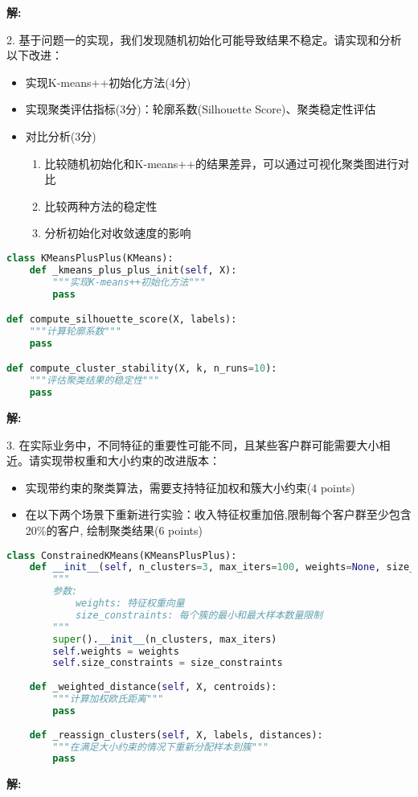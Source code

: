 \documentclass[8pt]{article}
\begin{document}
\textbf{\large 解:}

\vspace{3em}

2. 基于问题一的实现，我们发现随机初始化可能导致结果不稳定。请实现和分析以下改进：
\begin{itemize}
    \item 实现K-means++初始化方法(4分)
    \item 实现聚类评估指标(3分)：轮廓系数(Silhouette Score)、聚类稳定性评估
    \item 对比分析(3分)
    \begin{enumerate}
        \item 比较随机初始化和K-means++的结果差异，可以通过可视化聚类图进行对比
\item 比较两种方法的稳定性
\item 分析初始化对收敛速度的影响
    \end{enumerate}
\end{itemize}

\begin{lstlisting}[language=Python, caption=Kmeans++部分实现]
class KMeansPlusPlus(KMeans):
    def _kmeans_plus_plus_init(self, X):
        """实现K-means++初始化方法"""
        pass

def compute_silhouette_score(X, labels):
    """计算轮廓系数"""
    pass

def compute_cluster_stability(X, k, n_runs=10):
    """评估聚类结果的稳定性"""
    pass
\end{lstlisting}

\textbf{\large 解:}

\vspace{3em}

3. 在实际业务中，不同特征的重要性可能不同，且某些客户群可能需要大小相近。请实现带权重和大小约束的改进版本：
\begin{itemize}
    \item 实现带约束的聚类算法，需要支持特征加权和簇大小约束(4 points)
    \item 在以下两个场景下重新进行实验：收入特征权重加倍,限制每个客户群至少包含20\%的客户, 绘制聚类结果(6 points)
\end{itemize}
\begin{lstlisting}[language=Python, caption=带约束的聚类算法部分实现]
class ConstrainedKMeans(KMeansPlusPlus):
    def __init__(self, n_clusters=3, max_iters=100, weights=None, size_constraints=None):
        """
        参数:
            weights: 特征权重向量
            size_constraints: 每个簇的最小和最大样本数量限制
        """
        super().__init__(n_clusters, max_iters)
        self.weights = weights
        self.size_constraints = size_constraints
        
    def _weighted_distance(self, X, centroids):
        """计算加权欧氏距离"""
        pass
        
    def _reassign_clusters(self, X, labels, distances):
        """在满足大小约束的情况下重新分配样本到簇"""
        pass
\end{lstlisting}


\textbf{\large 解:}

\vspace{3em}
\end{document}
